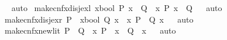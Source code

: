 \begin{isabellebody}
\isadelimproof
\ %
\endisadelimproof
%
\isatagproof
{}\isamarkupfalse%
\ auto%
\endisatagproof
{\isafoldproof}%
%
\isadelimproof
%
\endisadelimproof
\isanewline
\isanewline
{}\isamarkupfalse%
\ make{\isacharunderscore}{\kern0pt}cnfx{\isacharunderscore}{\kern0pt}disj{\isacharunderscore}{\kern0pt}ex{\isacharunderscore}{\kern0pt}l{\isacharcolon}{\kern0pt}\ {\isachardoublequoteopen}{\isacharparenleft}{\kern0pt}{\isacharparenleft}{\kern0pt}{\isasymexists}{\isacharparenleft}{\kern0pt}x{\isacharcolon}{\kern0pt}{\isacharcolon}{\kern0pt}bool{\isacharparenright}{\kern0pt}{\isachardot}{\kern0pt}\ P\ x{\isacharparenright}{\kern0pt}\ {\isasymor}\ Q{\isacharparenright}{\kern0pt}\ {\isacharequal}{\kern0pt}\ {\isacharparenleft}{\kern0pt}{\isasymexists}x{\isachardot}{\kern0pt}\ P\ x\ {\isasymor}\ Q{\isacharparenright}{\kern0pt}{\isachardoublequoteclose}%
\isadelimproof
\ %
\endisadelimproof
%
\isatagproof
{}\isamarkupfalse%
\ auto%
\endisatagproof
{\isafoldproof}%
%
\isadelimproof
%
\endisadelimproof
\isanewline
{}\isamarkupfalse%
\ make{\isacharunderscore}{\kern0pt}cnfx{\isacharunderscore}{\kern0pt}disj{\isacharunderscore}{\kern0pt}ex{\isacharunderscore}{\kern0pt}r{\isacharcolon}{\kern0pt}\ {\isachardoublequoteopen}{\isacharparenleft}{\kern0pt}P\ {\isasymor}\ {\isacharparenleft}{\kern0pt}{\isasymexists}{\isacharparenleft}{\kern0pt}x{\isacharcolon}{\kern0pt}{\isacharcolon}{\kern0pt}bool{\isacharparenright}{\kern0pt}{\isachardot}{\kern0pt}\ Q\ x{\isacharparenright}{\kern0pt}{\isacharparenright}{\kern0pt}\ {\isacharequal}{\kern0pt}\ {\isacharparenleft}{\kern0pt}{\isasymexists}x{\isachardot}{\kern0pt}\ P\ {\isasymor}\ Q\ x{\isacharparenright}{\kern0pt}{\isachardoublequoteclose}%
\isadelimproof
\ %
\endisadelimproof
%
\isatagproof
{}\isamarkupfalse%
\ auto%
\endisatagproof
{\isafoldproof}%
%
\isadelimproof
%
\endisadelimproof
\isanewline
{}\isamarkupfalse%
\ make{\isacharunderscore}{\kern0pt}cnfx{\isacharunderscore}{\kern0pt}newlit{\isacharcolon}{\kern0pt}\ {\isachardoublequoteopen}{\isacharparenleft}{\kern0pt}P\ {\isasymor}\ Q{\isacharparenright}{\kern0pt}\ {\isacharequal}{\kern0pt}\ {\isacharparenleft}{\kern0pt}{\isasymexists}x{\isachardot}{\kern0pt}\ {\isacharparenleft}{\kern0pt}P\ {\isasymor}\ x{\isacharparenright}{\kern0pt}\ {\isasymand}\ {\isacharparenleft}{\kern0pt}Q\ {\isasymor}\ {\isasymnot}x{\isacharparenright}{\kern0pt}{\isacharparenright}{\kern0pt}{\isachardoublequoteclose}%
\isadelimproof
\ %
\endisadelimproof
%
\isatagproof
{}\isamarkupfalse%
\ auto%
\endisatagproof

\end{isabellebody}
